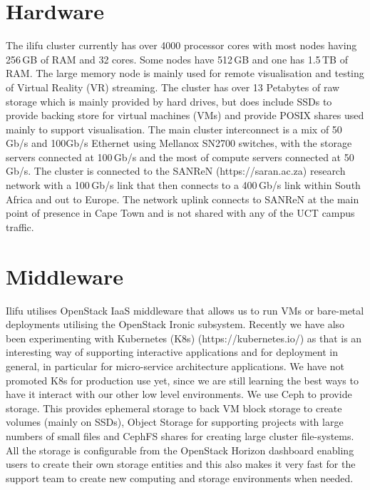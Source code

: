 \documentclass{iau_FM}
\begin{document}


\section{Hardware}
\label{sec:hardware}



The ilifu cluster currently has over 4000 processor cores with most nodes having 256\,GB of RAM and 32 cores. 
Some nodes have 512\,GB 
and one has 1.5\,TB of RAM. The large memory node is mainly used for remote visualisation 
 and testing of Virtual
Reality (VR) streaming. The cluster has over 13 Petabytes of raw storage which is mainly provided
 by hard drives, but 
does include SSDs to provide backing store for virtual machines (VMs) and provide
POSIX shares used mainly
to support visualisation. The main
 cluster interconnect is a mix of 50\,Gb/s and 100Gb/s Ethernet using Mellanox SN2700 switches, 
 with the storage servers connected at 100\,Gb/s and the 
most of compute servers connected at 50\,Gb/s. The cluster is connected to 
the SANReN (https://saran.ac.za) research network with a 100\,Gb/s link
that then connects to a 400\,Gb/s link within South Africa and out to Europe. 
The network uplink connects 
to SANReN at the main point of presence in Cape Town and is not shared
with any of the UCT campus traffic.


\section{Middleware}
\label{sec:middleware}

{\sc Ilifu} utilises OpenStack IaaS middleware that allows us to run VMs
 or bare-metal deployments
utilising the OpenStack Ironic subsystem. Recently we have also been experimenting with 
Kubernetes (K8s) (https://kubernetes.io/)
as that is an interesting way of supporting interactive applications and for deployment
in general, in particular for micro-service architecture applications. We have not promoted K8s for
 production use yet, since we are still learning the best ways to have it interact with our
 other low level environments.
We use Ceph to provide storage. This provides ephemeral storage to back VM
block storage to create volumes (mainly on SSDs), Object Storage for supporting projects
with large numbers of small files and
CephFS shares for creating large cluster file-systems. All the storage is configurable from the 
OpenStack Horizon dashboard enabling users to create their own storage entities
and this also makes it very fast for the support team to create new computing
and storage environments when needed.
\end{document}
